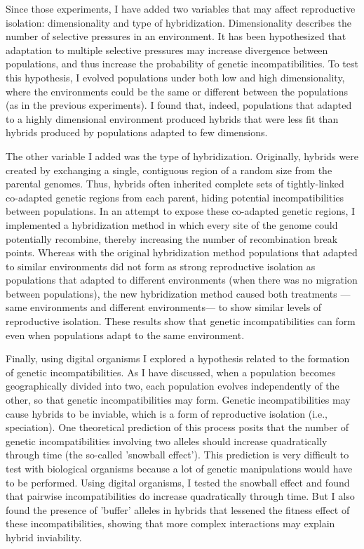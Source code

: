 \documentclass[12pt]{article}
\begin{document}
Since those experiments, I have added two
variables that may affect reproductive isolation:
dimensionality and type of hybridization.
%
Dimensionality describes the number of selective pressures
in an environment.
%
It has been hypothesized that adaptation
to multiple selective pressures may increase divergence
between populations, and thus increase the probability
of genetic incompatibilities.
%
To test this hypothesis, I evolved populations
under both low and high dimensionality,
where the environments could be the same or different
between the populations (as in the previous experiments).
%
I found that, indeed, populations that adapted to a highly
dimensional environment produced hybrids that were less fit
than hybrids produced by populations adapted to few dimensions.



The other variable I added was the type of hybridization.
%
Originally, hybrids were created by exchanging
a single, contiguous region of a random size from the parental genomes.
%
Thus, hybrids often inherited complete sets of
tightly-linked co-adapted genetic regions from each parent,
hiding potential incompatibilities between populations.
%
In an attempt to expose these co-adapted genetic regions,
I implemented a hybridization method in which every site of the genome
could potentially recombine, thereby increasing the number
of recombination break points.
%
Whereas with the original hybridization method
populations that adapted to similar environments
did not form as strong reproductive isolation
as populations that adapted to different environments
(when there was no migration between populations),
the new hybridization method caused both treatments%
---same environments and different environments---%
to show similar levels of reproductive isolation.
%
These results show that genetic incompatibilities
can form even when populations adapt to the same environment.



Finally,
using digital organisms I explored a hypothesis
related to the formation of genetic incompatibilities.
%
As I have discussed,
when a population becomes geographically divided into two,
each population evolves independently of the other,
so that genetic incompatibilities may form.
%
Genetic incompatibilities may cause hybrids to be inviable,
which is a form of reproductive isolation (i.e., speciation).
%
One theoretical prediction of this process
posits that the number of genetic incompatibilities
involving two alleles should increase quadratically through time
(the so-called 'snowball effect').
%
This prediction is very difficult to test with biological organisms
because a lot of genetic manipulations would have to be performed.
%
Using digital organisms, I tested the snowball effect
and found that pairwise incompatibilities do increase quadratically
through time.
%
But I also found the presence of 'buffer' alleles in hybrids
that lessened the fitness effect of these incompatibilities,
showing that more complex interactions may explain hybrid inviability.
\end{document}
